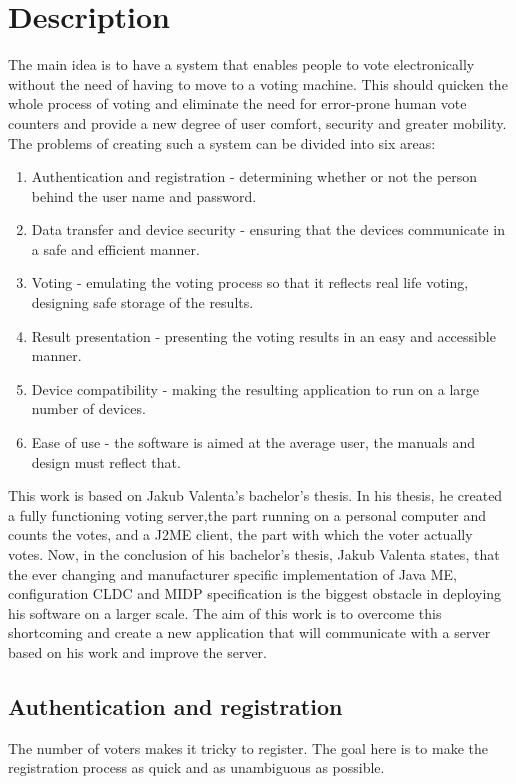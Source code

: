 \documentclass[11pt,twoside,a4paper]{book}
\begin{document}
\section{Description}
The main idea is to have a system that enables people to vote electronically without the need of having to move to a voting machine. This should quicken the whole process of voting and eliminate the need for error-prone human vote counters and provide a new degree of user comfort, security and greater mobility. The problems of creating such a system can be divided into six areas:
\begin{enumerate}
\item Authentication and registration -  determining whether or not the person behind the user name and password.
\item Data transfer and device security - ensuring that the devices communicate in a safe and efficient manner.
\item Voting - 	emulating the voting process so that it reflects real life voting, designing safe storage of the results.
\item Result presentation - presenting the voting results in an easy and accessible manner.
\item Device compatibility - making the resulting application to run on a large number of devices.
\item Ease of use - the software is aimed at the average user, the manuals and design must reflect that.
\end{enumerate}

This work is based on Jakub Valenta's bachelor's thesis\cite{bakalarkaJV}. In his thesis, he created a fully functioning voting server,the part running on a personal computer and counts the votes, and a J2ME client, the part with which the voter actually votes. Now, in the conclusion of his bachelor's thesis, Jakub Valenta \cite{bakalarkaJV} states, that the ever changing and manufacturer specific implementation of Java ME, configuration CLDC\cite{cldc} and MIDP\cite{midp} specification is the biggest obstacle in deploying his software on a larger scale.  The aim of this work is to overcome this shortcoming and create a new application that will communicate with a server based on his work and improve the server. 

\subsection{Authentication and registration}
The number of voters makes it tricky to register. The goal here is to make the registration process as quick and as unambiguous as possible.
\end{document}
